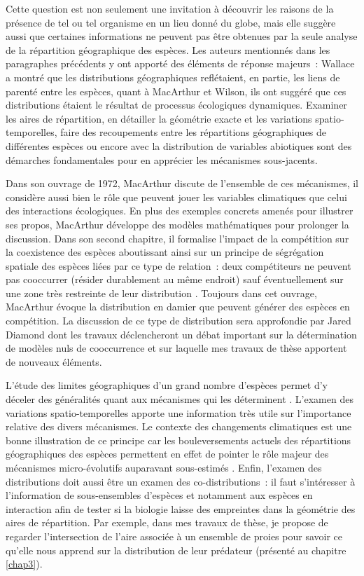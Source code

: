 Cette question est non seulement une invitation à découvrir les raisons
de la présence de tel ou tel organisme en un lieu donné du globe, mais
elle suggère aussi que certaines informations ne peuvent pas être
obtenues par la seule analyse de la répartition géographique des
espèces. Les auteurs mentionnés dans les paragraphes précédents y ont
apporté des éléments de réponse majeurs~: Wallace a montré que les
distributions géographiques reflétaient, en partie, les liens de parenté
entre les espèces, quant à MacArthur et Wilson, ils ont suggéré que ces
distributions étaient le résultat de processus écologiques dynamiques.
Examiner les aires de répartition, en détailler la géométrie exacte et
les variations spatio-temporelles, faire des recoupements entre les
répartitions géographiques de différentes espèces ou encore avec la
distribution de variables abiotiques sont des démarches fondamentales
pour en apprécier les mécanismes sous-jacents.

Dans son ouvrage de 1972, MacArthur discute de l'ensemble de ces
mécanismes, il considère aussi bien le rôle que peuvent jouer les
variables climatiques que celui des interactions écologiques. En plus
des exemples concrets amenés pour illustrer ses propos, MacArthur
développe des modèles mathématiques pour prolonger la discussion. Dans
son second chapitre, il formalise l'impact de la compétition sur la
coexistence des espèces aboutissant ainsi sur un principe de ségrégation
spatiale des espèces liées par ce type de relation~: deux compétiteurs
ne peuvent pas cooccurrer (résider durablement au même endroit) sauf
éventuellement sur une zone très restreinte de leur distribution
\citep{macarthur1972geographical}. Toujours dans cet ouvrage, MacArthur
évoque la distribution en damier que peuvent générer des espèces en
compétition. La discussion de ce type de distribution sera approfondie
par Jared Diamond \citep{Diamond1975} dont les travaux déclencheront un
débat important sur la détermination de modèles nuls de cooccurrence
\citep{Connor1979} et sur laquelle mes travaux de thèse apportent de
nouveaux éléments.

L'étude des limites géographiques d'un grand nombre d'espèces permet d'y
déceler des généralités quant aux mécanismes qui les déterminent
\citep{macarthur1972geographical}. L'examen des variations
spatio-temporelles apporte une information très utile sur l'importance
relative des divers mécanismes. Le contexte des changements climatiques
est une bonne illustration de ce principe car les bouleversements
actuels des répartitions géographiques des espèces permettent en effet
de pointer le rôle majeur des mécanismes micro-évolutifs auparavant
sous-estimés \citep{Lavergne2010}. Enfin, l'examen des distributions
doit aussi être un examen des co-distributions~: il faut s'intéresser à
l'information de sous-ensembles d'espèces et notamment aux espèces en
interaction afin de tester si la biologie laisse des empreintes dans la
géométrie des aires de répartition. Par exemple, dans mes travaux de
thèse, je propose de regarder l'intersection de l'aire associée à un
ensemble de proies pour savoir ce qu'elle nous apprend sur la
distribution de leur prédateur (présenté au chapitre \ref{chap3}).

